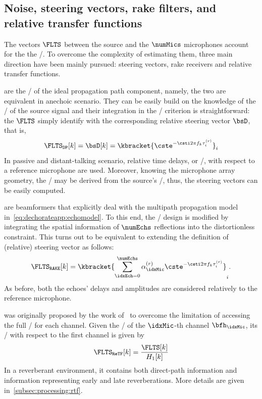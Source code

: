 \subsection{Noise, steering vectors, rake filters, and relative transfer functions}

The vectors $\FLTS$ between the source and the $\numMics$ microphones account for the the \RTFs/.
To overcome the complexity of estimating them, three main direction have been mainly pursued: steering vectors, rake receivers and relative transfer functions.

 are the \RTFs/ of the ideal propagation path component, namely, the two are equivalent in anechoic scenario.
They can be easily build on the knowledge of the \TOA/ of the source signal and their integration in the \MVDR/ criterion is straightforward:
the $\FLTS$ simply identify with the corresponding relative steering vector $\bsD$, that is,
\begin{equation}
    \FLTS_{\mathtt{DP}}[k] = \bsD[k] = \kbracket{ \cste^{-\csti 2 \pi f_k \tau_i^{(r)}} }_i
\end{equation}
In passive and distant-talking scenario, relative time delays, or \TDOAs/, with respect to a reference microphone are used.
Moreover, knowing the microphone array geometry, the \TDOAs/ may be derived from the source's \DOA/, thus, the steering vectors can be easily computed.

 are beamformers that explicitly deal with the multipath propagation model in~\cref{eq:dechorateapp:echomodel}.
To this end, the \MVDR/ design is modified by integrating the spatial information of $\numEchs$ reflections into the distortionless constraint.
This turns out to be equivalent to extending the definition of (relative) steering vector as follows:
\begin{equation}
    \FLTS_{\mathtt{RAKE}}[k] = \kbracket{ \sum_{\idxEch=0}^{\numEchs} \alpha_{\idxMic}^{(r)} \cste^{-\csti 2 \pi f_k \tau_i^{(r)}} }_i
    .
\end{equation}
As before, both the echoes' delays and amplitudes are considered relatively to the reference microphone.

 was originally proposed by the work of~ to overcome the limitation of accessing the full \RTFs/ for each channel.
Given the \RTF/ of the $\idxMic$-th channel $\bfh_\idxMic$, its \ReTF/ with respect to the first channel is given by
\begin{equation}
    \FLTS_{\mathtt{ReTF}}[k] = \frac{\FLTS[k]}{H_1[k]}
\end{equation}
In a reverberant environment, it contains both direct-path information and information representing early and late reverberations.
More details are given in~\cref{subsec:processing:rtf}.

